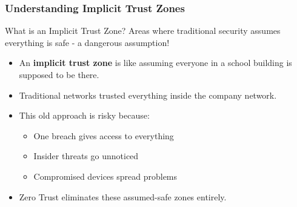 \documentclass{beamer}
\begin{document}
\begin{frame}
    \frametitle{Understanding Implicit Trust Zones}
    \begin{block}{What is an Implicit Trust Zone?}
        Areas where traditional security assumes everything is safe - a dangerous assumption!
    \end{block}
    \begin{itemize}
        \item An \textbf{implicit trust zone} is like assuming everyone in a school building is supposed to be there.
        \item Traditional networks trusted everything inside the company network.
        \item This old approach is risky because:
            \begin{itemize}
                \item One breach gives access to everything
                \item Insider threats go unnoticed
                \item Compromised devices spread problems
            \end{itemize}
        \item Zero Trust eliminates these assumed-safe zones entirely.
    \end{itemize}
\end{frame}
\end{document}
